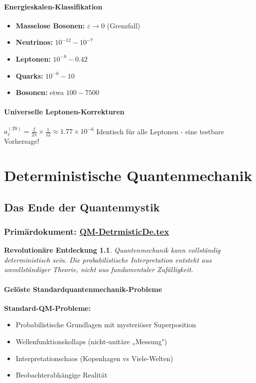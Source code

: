 \documentclass[12pt,a4paper]{report}
\newtheorem{discovery}{Revolutionäre Entdeckung}[chapter]
\begin{document}
	\subsubsection{Energieskalen-Klassifikation}
	\begin{itemize}
		\item \textbf{Masselose Bosonen:} $\varepsilon \rightarrow 0$ (Grenzfall)
		\item \textbf{Neutrinos:} $10^{-12} - 10^{-7}$
		\item \textbf{Leptonen:} $10^{-8} - 0.42$
		\item \textbf{Quarks:} $10^{-6} - 10$
		\item \textbf{Bosonen:} etwa $100 - 7500$
	\end{itemize}
	
	\subsubsection{Universelle Leptonen-Korrekturen}
	$a_\ell^{(T0)} = \frac{\xi}{2\pi} \times \frac{1}{12} \approx 1.77 \times 10^{-6}$
	Identisch für alle Leptonen - eine testbare Vorhersage!
	
	\chapter{Deterministische Quantenmechanik}
	
	\section{Das Ende der Quantenmystik}
	\subsection{Primärdokument: \href{https://github.com/jpascher/T0-Time-Mass-Duality/tree/main/2/pdf/QM-DetrmisticDe.pdf}{QM-DetrmisticDe.tex}}
	
	\begin{discovery}
		Quantenmechanik kann vollständig deterministisch sein. Die probabilistische Interpretation entsteht aus unvollständiger Theorie, nicht aus fundamentaler Zufälligkeit.
	\end{discovery}
	
	\subsubsection{Gelöste Standardquantenmechanik-Probleme}
	\textbf{Standard-QM-Probleme:}
	\begin{itemize}
		\item Probabilistische Grundlagen mit mysteriöser Superposition
		\item Wellenfunktionskollaps (nicht-unitäre „Messung")
		\item Interpretationschaos (Kopenhagen vs Viele-Welten)
		\item Beobachterabhängige Realität
	\end{itemize}
	
\end{document}
